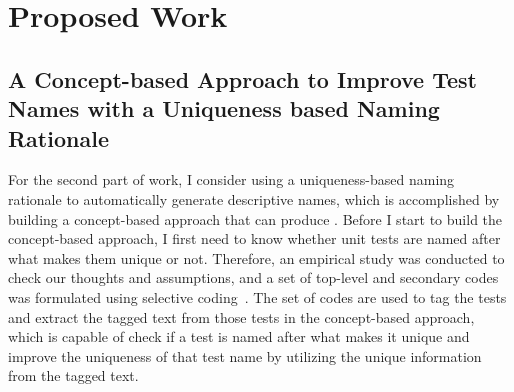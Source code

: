 \section{Proposed Work}
\subsection{A Concept-based Approach to Improve Test Names with a Uniqueness based Naming Rationale}
\label{sec:unique-test-name}

For the second part of work, I consider using a uniqueness-based naming rationale to automatically generate descriptive names, which is accomplished by building a concept-based approach that can produce .
%
Before I start to build the concept-based approach, I first need to know whether unit tests are named after what makes them unique or not.
%
Therefore, an empirical study was conducted to check our thoughts and assumptions, and a set of top-level and secondary codes was formulated using selective coding~\cite{glaser1967discovery,strauss1998basics}.
%
The set of codes are used to tag the tests and extract the tagged text from those tests in the concept-based approach, which is capable of check if a test is named after what makes it unique and improve the uniqueness of that test name by utilizing the unique information from the tagged text.